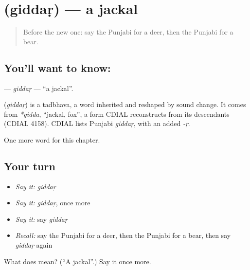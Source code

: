 \section[\texorpdfstring{\pa{ਗਿੱਦੜ} (giddaṛ)}{ਗਿੱਦੜ (giddaṛ)}]{ (giddaṛ) — a jackal}

\label{lesson:PA-C130-giddar}



\begin{quote}
Before the new one: say the Punjabi for a deer, then the Punjabi for a bear.
\end{quote}

\subsection*{You'll want to know: }
\textbf{} — \emph{giddaṛ} — \textquotedblleft{}a jackal\textquotedblright{}.

\begin{cousinweb}
\textbf{} (\emph{giddaṛ}) is a tadbhava, a word inherited and reshaped by sound change. It comes from \emph{*gidda}, \textquotedblleft{}jackal, fox\textquotedblright{}, a form CDIAL reconstructs from its descendants (CDIAL 4158). CDIAL lists Punjabi \emph{giddaṛ}, with an added \emph{-ṛ}.
\end{cousinweb}

\begin{grammarlens}[title={What you've built}]
One more word for this chapter.
\end{grammarlens}

\subsection*{Your turn}
\begin{itemize}
\raggedright
  \item \emph{Say it:} \emph{giddaṛ}
  \item \emph{Say it:} \emph{giddaṛ}, once more
  \item \emph{Say it:} say \emph{giddaṛ}
  \item \emph{Recall:} say the Punjabi for a deer, then the Punjabi for a bear, then say \emph{giddaṛ} again
\end{itemize}

\begin{tcolorbox}[breakable,colback=teal!4,colframe=teal!35!black,title={Before you move on}]
What does  mean? (\textquotedblleft{}A jackal\textquotedblright{}.) Say it once more.
\end{tcolorbox}
